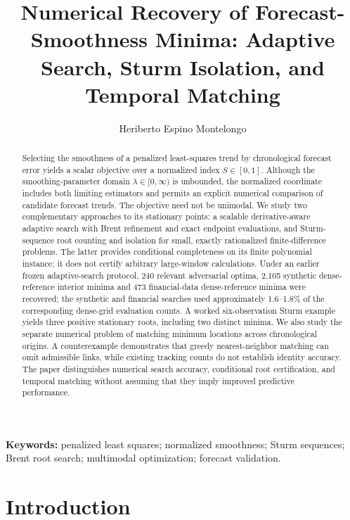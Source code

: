 \documentclass[english]{smcca}
\title{Numerical Recovery of Forecast-Smoothness Minima: Adaptive Search, Sturm Isolation, and Temporal Matching}
\author[1]{Heriberto Espino Montelongo}
\affil[1]{Universidad de las Am\'ericas Puebla, San Andr\'es Cholula, Puebla, Mexico.}
\date{}
\begin{document}
\maketitle

\begin{abstract}
Selecting the smoothness of a penalized least-squares trend by
chronological forecast error yields a scalar objective over a
normalized index $S\in[0,1]$. Although the smoothing-parameter
domain $\lambda\in[0,\infty)$ is unbounded, the normalized coordinate
includes both limiting estimators and permits an explicit numerical
comparison of candidate forecast trends. The objective need not
be unimodal. We study two complementary approaches to its stationary
points: a scalable derivative-aware adaptive search with Brent
refinement and exact endpoint evaluations, and Sturm-sequence
root counting and isolation for small, exactly rationalized
finite-difference problems. The latter provides conditional
completeness on its finite polynomial instance; it does not
certify arbitrary large-window calculations. Under an earlier
frozen adaptive-search protocol, 240 relevant adversarial
optima, 2,105 synthetic dense-reference interior minima and
473 financial-data dense-reference minima were recovered;
the synthetic and financial searches used approximately
1.6--1.8\% of the corresponding dense-grid evaluation counts.
A worked six-observation Sturm example yields three positive
stationary roots, including two distinct minima. We also study
the separate numerical problem of matching minimum locations
across chronological origins. A counterexample demonstrates that
greedy nearest-neighbor matching can omit admissible links,
while existing tracking counts do not establish identity accuracy.
The paper distinguishes numerical search accuracy, conditional
root certification, and temporal matching without assuming
that they imply improved predictive performance.
\end{abstract}

\vspace{1em}

\noindent\textbf{Keywords:} penalized least squares; normalized smoothness; Sturm sequences; Brent root search; multimodal optimization; forecast validation.

\vspace{10pt}

\section{Introduction}
\end{document}
